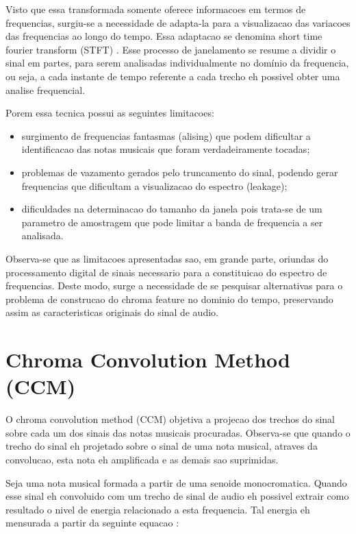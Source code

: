 \documentclass{article}
\begin{document}
	Visto que essa transformada somente oferece informacoes em termos de frequencias, surgiu-se a necessidade de adapta-la para a visualizacao das variacoes das frequencias ao longo do tempo. Essa adaptacao se denomina short time fourier transform (STFT) \cite{cohen1995time}. Esse processo de janelamento se resume a dividir o sinal em partes, para serem analisadas individualmente no domínio da frequencia, ou seja, a cada instante de tempo referente a cada trecho eh possivel obter uma analise frequencial.

	Porem essa tecnica possui as seguintes limitacoes:
	\begin{itemize}
		\item surgimento de frequencias fantasmas (alising) que podem dificultar a identificacao das notas musicais que foram verdadeiramente tocadas;
		\item problemas de vazamento gerados pelo truncamento do sinal, podendo gerar frequencias que dificultam a visualizacao do espectro (leakage);
		\item dificuldades na determinacao do tamanho da janela pois trata-se de um parametro de amostragem que pode limitar a banda de frequencia a ser analisada.
	\end{itemize}

	Observa-se que as limitacoes apresentadas sao, em grande parte, oriundas do processamento digital de sinais necessario para a constituicao do espectro de frequencias. Deste modo, surge a necessidade de se pesquisar alternativas para o problema de construcao do chroma feature no dominio do tempo, preservando assim as caracteristicas originais do sinal de audio.

\section{Chroma Convolution Method (CCM)}\label{sec:ccm}

	O chroma convolution method (CCM) objetiva a projecao dos trechos do sinal sobre cada um dos sinais das notas musicais procuradas. Observa-se que quando o trecho do sinal eh projetado sobre o sinal de uma nota musical, atraves da convolucao, esta nota eh amplificada e as demais sao suprimidas.

	Seja uma nota musical formada a partir de uma senoide monocromatica. Quando esse sinal eh convoluido com um trecho de sinal de audio eh possivel extrair como resultado o nivel de energia relacionado a esta frequencia. Tal energia eh mensurada a partir da seguinte equacao :
\end{document}
